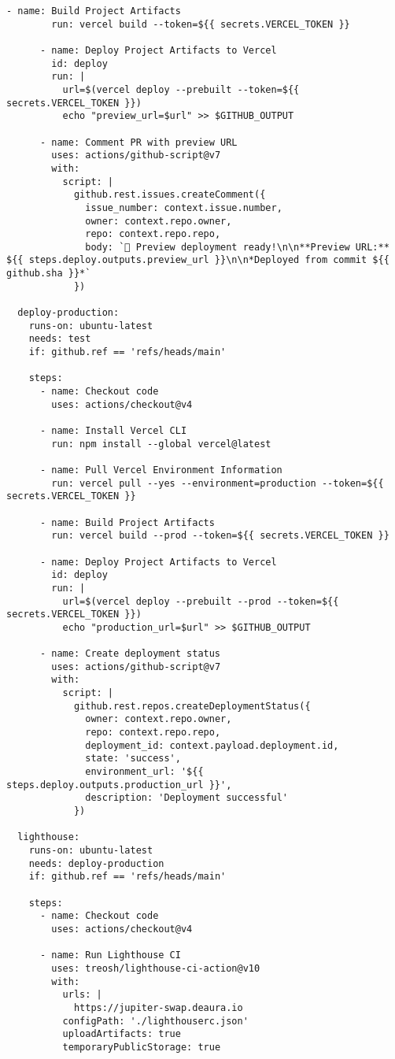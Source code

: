 \documentclass[11pt,a4paper]{article}
\begin{document}
\begin{lstlisting}[style=bash, caption=.github/workflows/deploy.yml]
      - name: Build Project Artifacts
        run: vercel build --token=${{ secrets.VERCEL_TOKEN }}
        
      - name: Deploy Project Artifacts to Vercel
        id: deploy
        run: |
          url=$(vercel deploy --prebuilt --token=${{ secrets.VERCEL_TOKEN }})
          echo "preview_url=$url" >> $GITHUB_OUTPUT
          
      - name: Comment PR with preview URL
        uses: actions/github-script@v7
        with:
          script: |
            github.rest.issues.createComment({
              issue_number: context.issue.number,
              owner: context.repo.owner,
              repo: context.repo.repo,
              body: `🚀 Preview deployment ready!\n\n**Preview URL:** ${{ steps.deploy.outputs.preview_url }}\n\n*Deployed from commit ${{ github.sha }}*`
            })
            
  deploy-production:
    runs-on: ubuntu-latest
    needs: test
    if: github.ref == 'refs/heads/main'
    
    steps:
      - name: Checkout code
        uses: actions/checkout@v4
        
      - name: Install Vercel CLI
        run: npm install --global vercel@latest
        
      - name: Pull Vercel Environment Information
        run: vercel pull --yes --environment=production --token=${{ secrets.VERCEL_TOKEN }}
        
      - name: Build Project Artifacts
        run: vercel build --prod --token=${{ secrets.VERCEL_TOKEN }}
        
      - name: Deploy Project Artifacts to Vercel
        id: deploy
        run: |
          url=$(vercel deploy --prebuilt --prod --token=${{ secrets.VERCEL_TOKEN }})
          echo "production_url=$url" >> $GITHUB_OUTPUT
          
      - name: Create deployment status
        uses: actions/github-script@v7
        with:
          script: |
            github.rest.repos.createDeploymentStatus({
              owner: context.repo.owner,
              repo: context.repo.repo,
              deployment_id: context.payload.deployment.id,
              state: 'success',
              environment_url: '${{ steps.deploy.outputs.production_url }}',
              description: 'Deployment successful'
            })
            
  lighthouse:
    runs-on: ubuntu-latest
    needs: deploy-production
    if: github.ref == 'refs/heads/main'
    
    steps:
      - name: Checkout code
        uses: actions/checkout@v4
        
      - name: Run Lighthouse CI
        uses: treosh/lighthouse-ci-action@v10
        with:
          urls: |
            https://jupiter-swap.deaura.io
          configPath: './lighthouserc.json'
          uploadArtifacts: true
          temporaryPublicStorage: true
\end{lstlisting}
\end{document}
